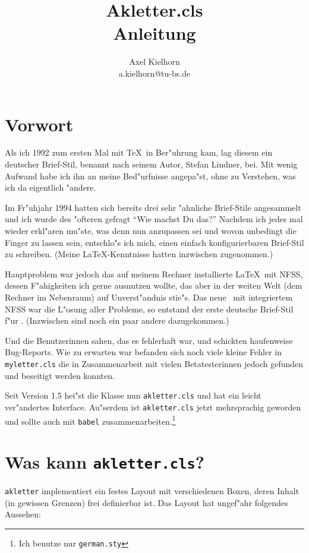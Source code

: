 \documentclass[a4paper]{article}
\title{Akletter.cls\\Anleitung}
\author{Axel Kielhorn\\a.kielhorn@tu-bs.de}
\begin{document}
\section{Vorwort}

Als ich 1992 zum ersten Mal mit \TeX\ in Ber"uhrung kam, lag 
diesem ein deutscher Brief-Stil, benannt nach seinem Autor, 
Stefan Lindner, bei. Mit wenig Aufwand habe ich ihn an meine 
Bed"urfnisse angepa"st, ohne zu Verstehen, was ich da eigentlich 
"andere.

Im Fr"uhjahr 1994 hatten sich bereits drei sehr "ahnliche 
Brief-Stile angesammelt und ich wurde des "ofteren gefragt "`Wie 
machst Du das?"' Nachdem ich jedes mal wieder erkl"aren mu"ste, 
was denn nun anzupassen sei und wovon unbedingt die Finger zu 
lassen sein, entschlo"s ich mich, einen einfach konfigurierbaren 
Brief-Stil zu schreiben. (Meine \LaTeX-Kenntnisse hatten 
inzwischen zugenommen.)

Hauptproblem war jedoch das auf meinem Rechner installierte 
\LaTeX\ mit NFSS, dessen F"ahigkeiten ich gerne ausnutzen wollte, 
das aber in der weiten Welt (dem Rechner im Nebenraum) auf 
Unverst"andnis stie"s. Das neue \LaTeXe\ mit integriertem NFSS war 
die L"osung aller Probleme, so entstand der erste deutsche 
Brief-Stil f"ur \LaTeXe. (Inzwischen sind noch ein paar andere 
dazugekommen.)

Und die Benutzerinnen sahen, das es fehlerhaft war, und 
schickten haufenweise Bug-Reports. Wie zu erwarten war befanden 
sich noch viele kleine Fehler in \texttt{myletter.cls} die in 
Zusammenarbeit mit vielen Betatesterinnen jedoch gefunden und 
beseitigt werden konnten.

Seit Version 1.5 hei"st die Klasse nun \texttt{akletter.cls} und hat 
ein leicht ver"andertes Interface.  Au"serdem ist 
\texttt{akletter.cls} jetzt mehrsprachig geworden und sollte auch mit 
\texttt{babel} zusammenarbeiten.\footnote{Ich benutze nur 
\texttt{german.sty}}

\section{Was kann \texttt{akletter.cls}?}

\texttt{akletter} implementiert ein festes Layout mit 
verschiedenen Boxen, deren Inhalt (in gewissen Grenzen) frei 
definierbar ist. Das Layout hat ungef"ahr folgendes Aussehen:
\end{document}
